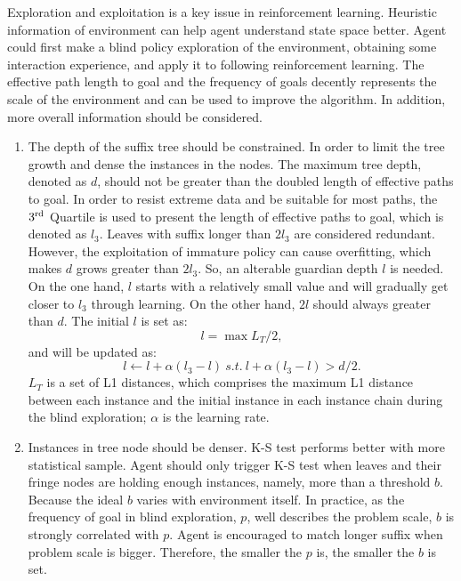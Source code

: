 \documentclass[conference]{IEEEtran}
\begin{document}
	Exploration and exploitation is a key issue in reinforcement learning. Heuristic information
	of environment can help agent understand state space better. Agent could first make a blind
	policy exploration of the environment, obtaining some interaction experience, and apply
	it to following reinforcement learning. The effective path length to goal and the frequency
	of goals decently represents the scale of the environment and can be used to improve the algorithm.
	In addition, more overall information should be considered.
	
	\begin{enumerate}
		\item The depth of the suffix tree should be constrained. In order to limit the tree growth and
		dense the instances in the nodes. The maximum tree depth, denoted as $d$, should not be greater
		than the doubled length of effective paths to goal. In order to resist extreme data and be suitable for most
		paths, the $3^\textnormal{rd}$ Quartile is used to present the length of effective paths to goal, which is
		denoted as $l_3$. Leaves with suffix longer than $2l_3$ are considered redundant. However,
		the exploitation of immature policy can cause overfitting, which makes $d$ grows greater than $2l_3$.
		So, an alterable guardian depth $l$ is needed. On the one hand, $l$ starts with a relatively
		small value and will gradually get closer to $l_3$ through learning. On the other hand, $2l$
		should always greater than $d$. The initial $l$ is set as:
		\begin{equation}
		l = \max{L_T}/2,
		\end{equation}
		and will be updated as:
		\begin{equation}
		l \leftarrow l + \alpha (l_3 - l)  \ s.t. \ l + \alpha (l_3 - l)> d/2. \label{equ:l3}
		\end{equation}
		$L_T$ is a set of L1 distances, which comprises the maximum L1 distance between each
		instance and the initial instance in each instance chain during the blind exploration;
		$\alpha$ is the learning rate.
		
		\item Instances in tree node should be denser. K-S test performs better with more statistical
		sample. Agent should only trigger K-S test when leaves and their fringe nodes are holding enough
		instances, namely, more than a threshold $b$. Because the ideal $b$ varies with environment itself.
		In practice, as the frequency of goal in blind exploration, $p$, well describes the problem scale,
		$b$ is strongly correlated with $p$. Agent is encouraged to match longer suffix when
		problem scale is bigger. Therefore, the smaller the $p$ is, the smaller the $b$ is set.
		

\end{enumerate}
\end{document}
